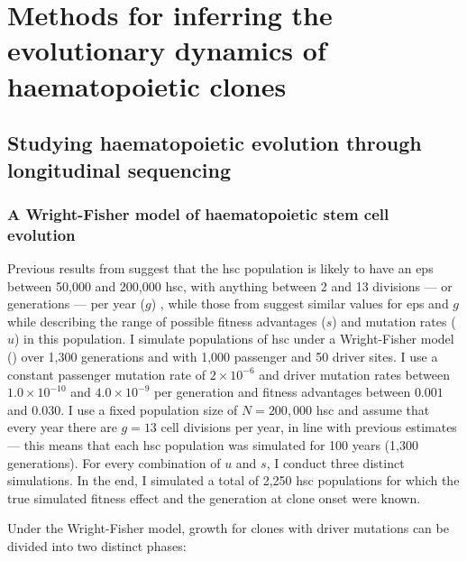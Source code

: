 \chapter{Methods for inferring the evolutionary dynamics of haematopoietic clones}

\section{Studying haematopoietic evolution through longitudinal sequencing}

\subsection{A Wright-Fisher model of haematopoietic stem cell evolution}

Previous results from  suggest that the \ac{hsc} population is likely to have an \ac{eps} between 50,000 and 200,000 \ac{hsc}, with anything between 2 and 13 divisions --- or generations --- per year ($g$) \cite{Lee-Six2018-lp}, while those from  suggest similar values for \ac{eps} and $g$ while describing the range of possible fitness advantages ($s$) and mutation rates ($u$) in this population. I simulate populations of \ac{hsc} under a Wright-Fisher model () \cite{Beerenwinkel_undated-up} over 1,300 generations and with 1,000 passenger and 50 driver sites. I use a constant passenger mutation rate of $2 \times 10^{-6}$ and driver mutation rates between $1.0 \times 10^{-10}$ and $4.0 \times 10^{-9}$ per generation and fitness advantages between $0.001$ and $0.030$. I use a fixed population size of $N=200,000$ \ac{hsc} and assume that every year there are $g=13$ cell divisions per year, in line with previous estimates \cite{Lee-Six2018-lp,Watson2020-pz} --- this means that each \ac{hsc} population was simulated for 100 years (1,300 generations). For every combination of $u$ and $s$, I conduct three distinct simulations. In the end, I simulated a total of 2,250 \ac{hsc} populations for which the true simulated fitness effect and the generation at clone onset were known. 

\begin{figure}[!ht]
	\label{fig:wf-example}
\end{figure}

Under the Wright-Fisher model, growth for clones with driver mutations can be divided into two distinct phases:

